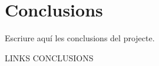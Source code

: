 \cleardoublepage
{}
\chapter*{Conclusions}

Escriure aquí les conclusions del projecte. 

LINKS CONCLUSIONS

